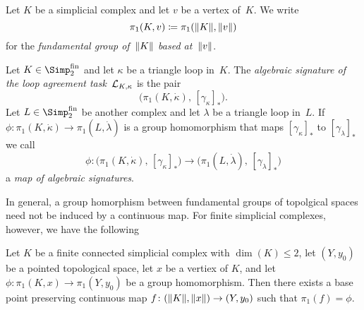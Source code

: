 \begin{thConvention}
    Let $K$ be a simplicial complex and let $v$ be a vertex of~$K$.
    We write
    \[ \pi_1(K,v) \coloneqq \pi_1(\lVert K\rVert, \lVert v\rVert) \]
    for the \emph{fundamental group of~$\lVert K\rVert$ based at~$\lVert v\rVert$}.
\end{thConvention}

\begin{thDef}
    Let $K\in\finSimp$ and let $\kappa$ be a triangle loop in~$K$. The
    \emph{algebraic signature of the loop agreement task~$\mathcal{L}_{K,\kappa}$}
    is the pair
    \[ \bigl( \pi_1(K,\dot\kappa), \, [\gamma_\kappa]_\ast \bigr) . \]
    Let $L\in\finSimp$ be another complex and let $\lambda$ be a triangle loop
    in~$L$. If $\phi\colon\pi_1(K,\dot\kappa)\to\pi_1(L,\dot\lambda)$ is a
    group homomorphism that maps $[\gamma_\kappa]_\ast$ to
    $[\gamma_\lambda]_\ast$ we call
    \[ \phi\colon \bigl( \pi_1(K,\dot\kappa), \, [\gamma_\kappa]_\ast \bigr)
        \to \bigl( \pi_1(L,\dot\lambda), \, [\gamma_\lambda]_\ast \bigr)
    \]
    a \emph{map of algebraic signatures}.
\end{thDef}

In general, a group homorphism between fundamental groups of topolgical spaces
need not be induced by a continuous map. For finite simplicial complexes,
however, we have the following

\begin{thLemma}
    \label{ch3:continuousrealization}
    Let $K$ be a finite connected simplicial complex with $\dim(K)\leq 2$,
    let $(Y,y_0)$ be a pointed topological space, let $x$ be a vertiex of $K$,
    and let $\phi\colon\pi_1(K,x)\to\pi_1(Y,y_0)$ be a group homomorphism.
    Then there exists a base point preserving continuous map
    $f\colon(\lVert K\rVert,\lVert x\rVert)\to(Y,y_0)$ such that $\pi_1(f) = \phi$.
\end{thLemma}

